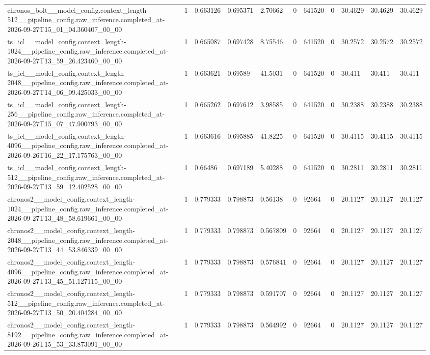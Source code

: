 \begin{tabular}{lllllllllll}
chronos\_bolt\_\_model\_config.context\_length-512\_\_pipeline\_config.raw\_inference.completed\_at-2026-09-27T15\_01\_04.360407\_00\_00 & 1 & 0.663126 & 0.695371 & 2.70662 & 0 & 641520 & 0 & 30.4629 & 30.4629 & 30.4629 \\
ts\_icl\_\_model\_config.context\_length-1024\_\_pipeline\_config.raw\_inference.completed\_at-2026-09-27T13\_59\_26.423460\_00\_00 & 1 & 0.665087 & 0.697428 & 8.75546 & 0 & 641520 & 0 & 30.2572 & 30.2572 & 30.2572 \\
ts\_icl\_\_model\_config.context\_length-2048\_\_pipeline\_config.raw\_inference.completed\_at-2026-09-27T14\_06\_09.425033\_00\_00 & 1 & 0.663621 & 0.69589 & 41.5031 & 0 & 641520 & 0 & 30.411 & 30.411 & 30.411 \\
ts\_icl\_\_model\_config.context\_length-256\_\_pipeline\_config.raw\_inference.completed\_at-2026-09-27T15\_07\_47.900793\_00\_00 & 1 & 0.665262 & 0.697612 & 3.98585 & 0 & 641520 & 0 & 30.2388 & 30.2388 & 30.2388 \\
ts\_icl\_\_model\_config.context\_length-4096\_\_pipeline\_config.raw\_inference.completed\_at-2026-09-26T16\_22\_17.175763\_00\_00 & 1 & 0.663616 & 0.695885 & 41.8225 & 0 & 641520 & 0 & 30.4115 & 30.4115 & 30.4115 \\
ts\_icl\_\_model\_config.context\_length-512\_\_pipeline\_config.raw\_inference.completed\_at-2026-09-27T13\_59\_12.402528\_00\_00 & 1 & 0.66486 & 0.697189 & 5.40288 & 0 & 641520 & 0 & 30.2811 & 30.2811 & 30.2811 \\
chronos2\_\_model\_config.context\_length-1024\_\_pipeline\_config.raw\_inference.completed\_at-2026-09-27T13\_48\_58.619661\_00\_00 & 1 & 0.779333 & 0.798873 & 0.56138 & 0 & 92664 & 0 & 20.1127 & 20.1127 & 20.1127 \\
chronos2\_\_model\_config.context\_length-2048\_\_pipeline\_config.raw\_inference.completed\_at-2026-09-27T13\_44\_53.846339\_00\_00 & 1 & 0.779333 & 0.798873 & 0.567809 & 0 & 92664 & 0 & 20.1127 & 20.1127 & 20.1127 \\
chronos2\_\_model\_config.context\_length-4096\_\_pipeline\_config.raw\_inference.completed\_at-2026-09-27T13\_45\_51.127115\_00\_00 & 1 & 0.779333 & 0.798873 & 0.576841 & 0 & 92664 & 0 & 20.1127 & 20.1127 & 20.1127 \\
chronos2\_\_model\_config.context\_length-512\_\_pipeline\_config.raw\_inference.completed\_at-2026-09-27T13\_50\_20.404284\_00\_00 & 1 & 0.779333 & 0.798873 & 0.591707 & 0 & 92664 & 0 & 20.1127 & 20.1127 & 20.1127 \\
chronos2\_\_model\_config.context\_length-8192\_\_pipeline\_config.raw\_inference.completed\_at-2026-09-26T15\_53\_33.873091\_00\_00 & 1 & 0.779333 & 0.798873 & 0.564992 & 0 & 92664 & 0 & 20.1127 & 20.1127 & 20.1127 \\

\end{tabular}
